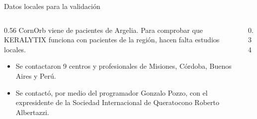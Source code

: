 \begin{frame}{Datos locales para la validación}
    \begin{columns}[c, totalwidth=0.98\textwidth]
        \hspace*{0.035\textwidth}
        \begin{column}{0.56\textwidth}
            CornOrb viene de pacientes de Argelia. Para comprobar que KERALYTIX funciona con pacientes de la región, hacen falta estudios locales.
            \vspace{-0.5 cm}
            \begin{itemize}
                \item Se contactaron 9 centros y profesionales de Misiones, Córdoba, Buenos Aires y Perú.
                \item Se contactó, por medio del programador Gonzalo Pozzo, con el expresidente de la Sociedad Internacional de Queratocono Roberto Albertazzi. 
            \end{itemize}
        \end{column}
        \hspace{0.03\textwidth}
        \begin{column}{0.34\textwidth}
            \centering
        \end{column}
    \end{columns}
\end{frame}

